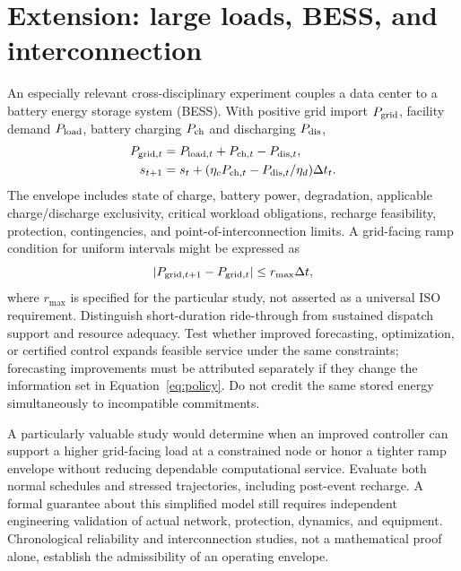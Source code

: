\documentclass[11pt,letterpaper]{article}
\begin{document}
\section{Extension: large loads, BESS, and interconnection}
An especially relevant cross-disciplinary experiment couples a data center to a battery energy storage system (BESS). With positive grid import $P_{\rm grid}$, facility demand $P_{\rm load}$, battery charging $P_{\rm ch}$ and discharging $P_{\rm dis}$,
\begin{align}
P_{{\rm grid},t}&=P_{{\rm load},t}+P_{{\rm ch},t}-P_{{\rm dis},t},\\
s_{t+1}&=s_t+(\eta_cP_{{\rm ch},t}-P_{{\rm dis},t}/\eta_d)\Delta t_t.
\end{align}
The envelope includes state of charge, battery power, degradation, applicable charge/discharge exclusivity, critical workload obligations, recharge feasibility, protection, contingencies, and point-of-interconnection limits. A grid-facing ramp condition for uniform intervals might be expressed as
\begin{equation}
|P_{{\rm grid},t+1}-P_{{\rm grid},t}|\leq r_{\max}\Delta t,
\end{equation}
where $r_{\max}$ is specified for the particular study, not asserted as a universal ISO requirement. Distinguish short-duration ride-through from sustained dispatch support and resource adequacy. Test whether improved forecasting, optimization, or certified control expands feasible service under the same constraints; forecasting improvements must be attributed separately if they change the information set in Equation~\ref{eq:policy}. Do not credit the same stored energy simultaneously to incompatible commitments.

A particularly valuable study would determine when an improved controller can support a higher grid-facing load at a constrained node or honor a tighter ramp envelope without reducing dependable computational service. Evaluate both normal schedules and stressed trajectories, including post-event recharge. A formal guarantee about this simplified model still requires independent engineering validation of actual network, protection, dynamics, and equipment. Chronological reliability and interconnection studies, not a mathematical proof alone, establish the admissibility of an operating envelope.
\end{document}
